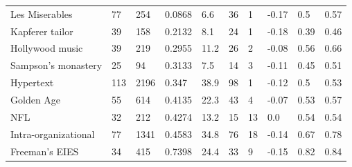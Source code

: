 \documentclass[12pt]{article}
\begin{document}
\begin{table}[H]
{\begin{tabular}{l|lll|llll|ll}
				Les Miserables & 77 & 254 & 0.0868 & 6.6 & 36 & 1 & -0.17 & 0.5 & 0.57\\
				Kapferer tailor & 39 & 158 & 0.2132 & 8.1 & 24 & 1 & -0.18 & 0.39 & 0.46\\
				Hollywood music & 39 & 219 & 0.2955 & 11.2 & 26 & 2 & -0.08 & 0.56 & 0.66\\
				Sampson's monastery & 25 & 94 & 0.3133 & 7.5 & 14 & 3 & -0.11 & 0.45 & 0.51\\
				Hypertext & 113 & 2196 & 0.347 & 38.9 & 98 & 1 & -0.12 & 0.5 & 0.53\\
				Golden Age & 55 & 614 & 0.4135 & 22.3 & 43 & 4 & -0.07 & 0.53 & 0.57\\
				NFL & 32 & 212 & 0.4274 & 13.2 & 15 & 13 & 0.0 & 0.54 & 0.54\\
				Intra-organizational & 77 & 1341 & 0.4583 & 34.8 & 76 & 18 & -0.14 & 0.67 & 0.78\\
				Freeman's EIES & 34 & 415 & 0.7398 & 24.4 & 33 & 9 & -0.15 & 0.82 & 0.84\\
				\bottomrule[1.5pt]
		\end{tabular}}
	\end{table}
	
\end{document}
